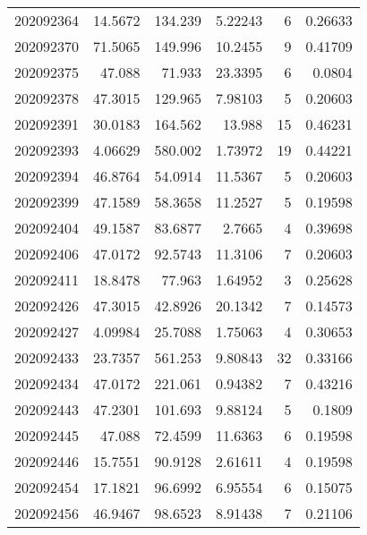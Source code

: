 \begin{tabular}{rrrrrr}
 202092364 &         14.5672  &      134.239  &            5.22243 &           6 & 0.26633 \\
 202092370 &         71.5065  &      149.996  &           10.2455  &           9 & 0.41709 \\
 202092375 &         47.088   &       71.933  &           23.3395  &           6 & 0.0804  \\
 202092378 &         47.3015  &      129.965  &            7.98103 &           5 & 0.20603 \\
 202092391 &         30.0183  &      164.562  &           13.988   &          15 & 0.46231 \\
 202092393 &          4.06629 &      580.002  &            1.73972 &          19 & 0.44221 \\
 202092394 &         46.8764  &       54.0914 &           11.5367  &           5 & 0.20603 \\
 202092399 &         47.1589  &       58.3658 &           11.2527  &           5 & 0.19598 \\
 202092404 &         49.1587  &       83.6877 &            2.7665  &           4 & 0.39698 \\
 202092406 &         47.0172  &       92.5743 &           11.3106  &           7 & 0.20603 \\
 202092411 &         18.8478  &       77.963  &            1.64952 &           3 & 0.25628 \\
 202092426 &         47.3015  &       42.8926 &           20.1342  &           7 & 0.14573 \\
 202092427 &          4.09984 &       25.7088 &            1.75063 &           4 & 0.30653 \\
 202092433 &         23.7357  &      561.253  &            9.80843 &          32 & 0.33166 \\
 202092434 &         47.0172  &      221.061  &            0.94382 &           7 & 0.43216 \\
 202092443 &         47.2301  &      101.693  &            9.88124 &           5 & 0.1809  \\
 202092445 &         47.088   &       72.4599 &           11.6363  &           6 & 0.19598 \\
 202092446 &         15.7551  &       90.9128 &            2.61611 &           4 & 0.19598 \\
 202092454 &         17.1821  &       96.6992 &            6.95554 &           6 & 0.15075 \\
 202092456 &         46.9467  &       98.6523 &            8.91438 &           7 & 0.21106 \\

\end{tabular}
